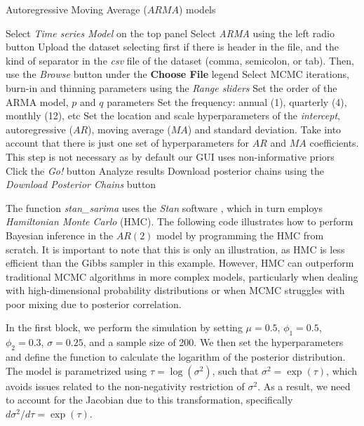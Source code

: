 \begin{algorithm}[h!]
	\caption{Autoregressive Moving Average ($ARMA$) models}\label{alg:ARMA}
	\begin{algorithmic}[1]  		 			
		\State Select \textit{Time series Model} on the top panel
		\State Select \textit{ARMA} using the left radio button
		\State Upload the dataset selecting first if there is header in the file, and the kind of separator in the \textit{csv} file of the dataset (comma, semicolon, or tab). Then, use the \textit{Browse} button under the \textbf{Choose File} legend
		\State Select MCMC iterations, burn-in and thinning parameters using the \textit{Range sliders}
		\State Set the order of the ARMA model, $p$ and $q$ parameters
		\State Set the frequency: annual (1), quarterly (4), monthly (12), etc
		\State Set the location and scale hyperparameters of the \textit{intercept}, autoregressive ($AR$), moving average ($MA$) and standard deviation. Take into account that there is just one set of hyperparameters for $AR$ and $MA$ coefficients. This step is not necessary as by default our GUI uses non-informative priors
		\State Click the \textit{Go!} button
		\State Analyze results
		\State Download posterior chains using the \textit{Download Posterior Chains} button
	\end{algorithmic} 
\end{algorithm}

The function \textit{stan\_sarima} uses the \textit{Stan} software \cite{Stan2024}, which in turn employs \textit{Hamiltonian Monte Carlo} (HMC). The following code illustrates how to perform Bayesian inference in the $AR(2)$ model by programming the HMC from scratch. It is important to note that this is only an illustration, as HMC is less efficient than the Gibbs sampler in this example. However, HMC can outperform traditional MCMC algorithms in more complex models, particularly when dealing with high-dimensional probability distributions or when MCMC struggles with poor mixing due to posterior correlation.

In the first block, we perform the simulation by setting $\mu=0.5$, $\phi_1=0.5$, $\phi_2=0.3$, $\sigma=0.25$, and a sample size of 200. We then set the hyperparameters and define the function to calculate the logarithm of the posterior distribution. The model is parametrized using $\tau = \log(\sigma^2)$, such that $\sigma^2=\exp(\tau)$, which avoids issues related to the non-negativity restriction of $\sigma^2$. As a result, we need to account for the Jacobian due to this transformation, specifically $d\sigma^2/d\tau = \exp(\tau)$.

